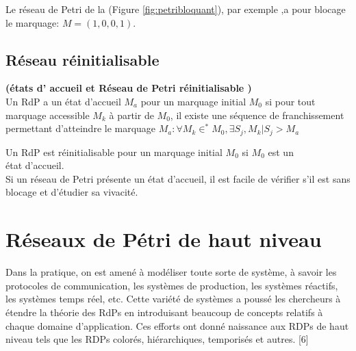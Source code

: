Le réseau de Petri de la (Figure \ref{fig:petribloquant}), par exemple ,a pour blocage le marquage: 
$M = (1,0,0,1)$.

\subsection{Réseau réinitialisable }
\begin{defn} \textbf{(états d' accueil et Réseau de Petri réinitialisable ) }\\
	Un RdP a un état d’accueil $ M_{a} $ pour un marquage initial $ M_{0} $ si pour tout marquage accessible $ M_{k} $ à partir de $ M_{0} $, il existe une séquence de franchissement permettant d'atteindre le marquage
	$M_{a}: \forall M_{k} \in^{*} M_{0},   \exists S_{j},M_{k}|S_{j}>M_{a}$
\end{defn}
Un RdP est réinitialisable pour un marquage initial $ M_{0} $ si $ M_{0} $ est un\\
état d'accueil.
\\

Si un réseau de Petri présente un état d’accueil, il est facile de vérifier s’il est sans blocage et d'étudier sa vivacité.

\section{ Réseaux de Pétri de haut niveau }
Dans la pratique, on est amené à modéliser toute sorte de système, à savoir les protocoles de communication, les systèmes de production, les systèmes réactifs, les systèmes temps réel, etc. Cette variété de systèmes a poussé les chercheurs à étendre la théorie des RdPs en introduisant beaucoup de concepts relatifs à chaque domaine d’application. Ces efforts ont donné naissance aux RDPs de haut niveau tels que les RDPs colorés, hiérarchiques, temporisés et autres. [6] 
